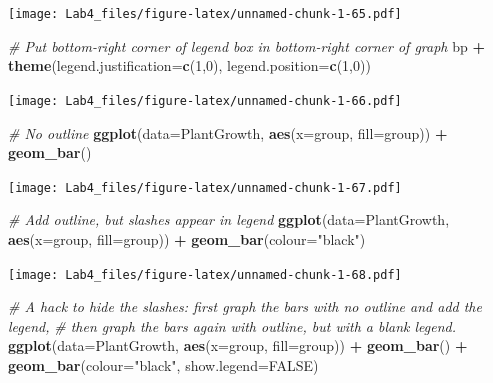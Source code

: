 \documentclass[]{article}
\newenvironment{Shaded}{\begin{snugshade}}{\end{snugshade}}
\newcommand{\KeywordTok}[1]{\textcolor[rgb]{0.13,0.29,0.53}{\textbf{#1}}}
\newcommand{\DataTypeTok}[1]{\textcolor[rgb]{0.13,0.29,0.53}{#1}}
\newcommand{\DecValTok}[1]{\textcolor[rgb]{0.00,0.00,0.81}{#1}}
\newcommand{\StringTok}[1]{\textcolor[rgb]{0.31,0.60,0.02}{#1}}
\newcommand{\CommentTok}[1]{\textcolor[rgb]{0.56,0.35,0.01}{\textit{#1}}}
\newcommand{\OtherTok}[1]{\textcolor[rgb]{0.56,0.35,0.01}{#1}}
\newcommand{\OperatorTok}[1]{\textcolor[rgb]{0.81,0.36,0.00}{\textbf{#1}}}
\newcommand{\NormalTok}[1]{#1}
\begin{document}
\texttt{[image: Lab4\_files/figure-latex/unnamed-chunk-1-65.pdf]}

\begin{Shaded}
\begin{Highlighting}[]
\CommentTok{# Put bottom-right corner of legend box in bottom-right corner of graph}
\NormalTok{bp }\OperatorTok{+}\StringTok{ }\KeywordTok{theme}\NormalTok{(}\DataTypeTok{legend.justification=}\KeywordTok{c}\NormalTok{(}\DecValTok{1}\NormalTok{,}\DecValTok{0}\NormalTok{), }\DataTypeTok{legend.position=}\KeywordTok{c}\NormalTok{(}\DecValTok{1}\NormalTok{,}\DecValTok{0}\NormalTok{))}
\end{Highlighting}
\end{Shaded}

\texttt{[image: Lab4\_files/figure-latex/unnamed-chunk-1-66.pdf]}

\begin{Shaded}
\begin{Highlighting}[]
\CommentTok{# No outline}
\KeywordTok{ggplot}\NormalTok{(}\DataTypeTok{data=}\NormalTok{PlantGrowth, }\KeywordTok{aes}\NormalTok{(}\DataTypeTok{x=}\NormalTok{group, }\DataTypeTok{fill=}\NormalTok{group)) }\OperatorTok{+}
\StringTok{    }\KeywordTok{geom_bar}\NormalTok{()}
\end{Highlighting}
\end{Shaded}

\texttt{[image: Lab4\_files/figure-latex/unnamed-chunk-1-67.pdf]}

\begin{Shaded}
\begin{Highlighting}[]
\CommentTok{# Add outline, but slashes appear in legend}
\KeywordTok{ggplot}\NormalTok{(}\DataTypeTok{data=}\NormalTok{PlantGrowth, }\KeywordTok{aes}\NormalTok{(}\DataTypeTok{x=}\NormalTok{group, }\DataTypeTok{fill=}\NormalTok{group)) }\OperatorTok{+}
\StringTok{    }\KeywordTok{geom_bar}\NormalTok{(}\DataTypeTok{colour=}\StringTok{"black"}\NormalTok{)}
\end{Highlighting}
\end{Shaded}

\texttt{[image: Lab4\_files/figure-latex/unnamed-chunk-1-68.pdf]}

\begin{Shaded}
\begin{Highlighting}[]
\CommentTok{# A hack to hide the slashes: first graph the bars with no outline and add the legend,}
\CommentTok{# then graph the bars again with outline, but with a blank legend.}
\KeywordTok{ggplot}\NormalTok{(}\DataTypeTok{data=}\NormalTok{PlantGrowth, }\KeywordTok{aes}\NormalTok{(}\DataTypeTok{x=}\NormalTok{group, }\DataTypeTok{fill=}\NormalTok{group)) }\OperatorTok{+}
\StringTok{    }\KeywordTok{geom_bar}\NormalTok{() }\OperatorTok{+}
\StringTok{    }\KeywordTok{geom_bar}\NormalTok{(}\DataTypeTok{colour=}\StringTok{"black"}\NormalTok{, }\DataTypeTok{show.legend=}\OtherTok{FALSE}\NormalTok{)}
\end{Highlighting}
\end{Shaded}
\end{document}
